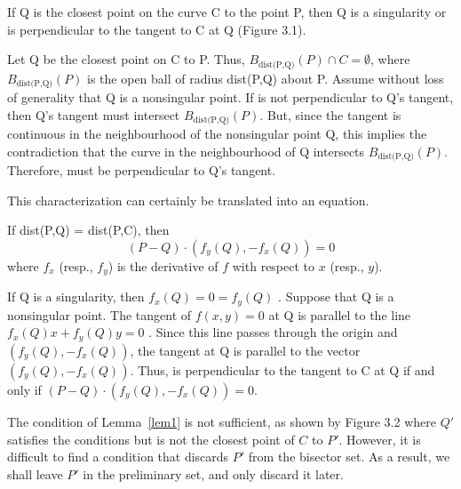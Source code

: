 \begin{lemma}
\label{lem1}
If Q is the closest point on the curve C to the point P,
then Q is a singularity
or  is perpendicular to the tangent to C at Q (Figure 3.1).
\end{lemma}
Let Q be the closest point on C to P.
Thus, $B_{\mbox{dist(P,Q)}}(P) \cap C = \emptyset$, 
where $B_{\mbox{dist(P,Q)}}(P)$
is the open ball of radius dist(P,Q) about P.
Assume without loss of generality that Q is a nonsingular point.
If  is not perpendicular to Q's tangent, then Q's tangent must 
intersect $B_{\mbox{dist(P,Q)}}(P)$.
But, since the tangent is continuous in the neighbourhood of the nonsingular 
point Q,
this implies the contradiction that the curve in the neighbourhood of Q 
intersects $B_{\mbox{dist(P,Q)}}(P)$.
Therefore,  must be perpendicular to Q's tangent.
\QED

\vspace{.25in}
\noindent This characterization can certainly be translated into an equation.

\begin{corollary}
\label{cor}
If dist(P,Q) = dist(P,C), then 
\begin{equation}
(P-Q) \cdot (f_{y}(Q),-f_{x}(Q)) = 0
\end{equation}
where $f_{x}$ (resp., $f_{y}$) is the derivative of $f$ with respect to $x$ 
(resp., $y$).
\end{corollary}
If Q is a singularity, then $f_{x}(Q) = 0 = f_{y}(Q)$ \cite{W50}.
Suppose that Q is a nonsingular point.
The tangent of $f(x,y)=0$ at Q is parallel to the line 
$f_{x}(Q)x + f_{y}(Q)y = 0$ \cite[p. 55]{W50}.
Since this line passes through the origin and $(f_{y}(Q),-f_{x}(Q))$, 
the tangent at Q is parallel to the vector $(f_{y}(Q),-f_{x}(Q))$.
Thus,  is perpendicular to the tangent to C at Q if and only if
$(P-Q) \cdot (f_{y}(Q),-f_{x}(Q)) = 0$.
\QED

\begin{example}
The condition of Lemma~\ref{lem1} is not sufficient, as shown by Figure 3.2 where
$Q'$ satisfies the conditions but is not the closest point of $C$ to $P'$.
However, it is difficult to find a condition that discards $P'$ from the bisector set.
As a result, we shall leave $P'$ in the preliminary set, and only discard it later.
\end{example}

